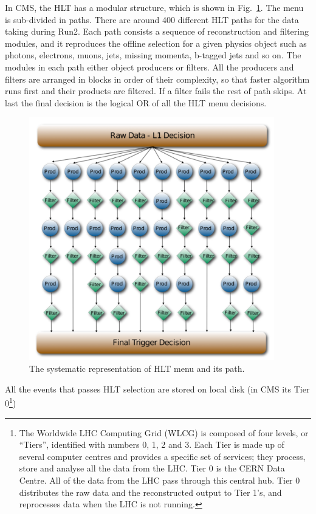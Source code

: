 In CMS, the HLT has a modular structure, which is shown in Fig.~\ref{fig:HLT_menue_workflow}. The menu is sub-divided in paths. There are around 400 different HLT paths for the data taking during Run2. Each path consists a sequence of reconstruction and filtering modules, and it reproduces the offline selection for a given physics object such as photons, electrons, muons, jets, missing momenta, b-tagged jets and so on. The modules in each path either object producers or filters. All the producers and filters are arranged in blocks in order of their complexity, so that faster algorithm runs first and their products are filtered. If a filter fails the rest of path skips. At last the final decision is the logical OR of all the HLT menu decisions.
\begin{figure}[htbp]
	\centering
	\includegraphics[width=0.95\textwidth]{figures/LHC/HLT_menu_workflow.png}
	\caption{The systematic representation of HLT menu and its path\cite{Perrotta2015}.}
	\label{fig:HLT_menue_workflow}
\end{figure}

All the events that passes HLT selection are stored on local disk (in CMS its Tier 0\footnote{The Worldwide LHC Computing Grid (WLCG) is composed of four levels, or “Tiers”, identified with numbers 0, 1, 2 and 3. Each Tier is made up of several computer centres and provides a specific set of services; they process, store and analyse all the data from the LHC. Tier 0 is the CERN Data Centre. All of the data from the LHC pass through this central hub. Tier 0 distributes the raw data and the reconstructed output to Tier 1’s, and reprocesses data when the LHC is not running.})


